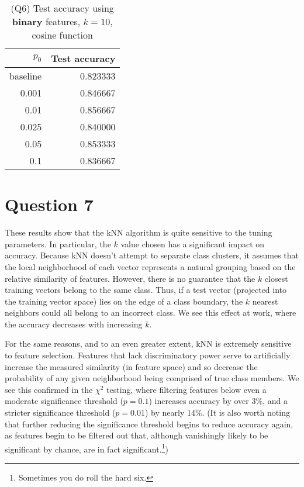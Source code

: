 \documentclass[oneside,justified,marginals=raggedouter]{tufte-handout}
\begin{document}
\begin{table}
\begin{tabular}{@{}rr@{}}
\toprule
$p_0$ & Test accuracy \\ \midrule
baseline & 0.823333 \\
0.001    & 0.846667 \\
0.01     & 0.856667 \\
0.025    & 0.840000 \\
0.05     & 0.853333 \\
0.1      & 0.836667 \\
\bottomrule
\end{tabular}
\caption{(Q6) Test accuracy using {\bf binary} features, {\bf $k=10$},
cosine function}
\end{table}

\section{Question 7}

These results show that the kNN algorithm is quite sensitive to the
tuning parameters. In particular, the $k$ value chosen has a significant
impact on accuracy. Because kNN doesn't attempt to separate class clusters,
it assumes that the local neighborhood of each vector
represents a natural grouping based on the relative
similarity of features. However, there is no guarantee that the $k$ closest
training vectors belong to the same class. Thus, if a test vector (projected
into the training vector space) lies on the edge of a class boundary, the
$k$ nearest neighbors could all belong to an incorrect class. We see this
effect at work, where the accuracy decreases with increasing $k$.

For the same reasons, and to an even greater extent, kNN is extremely
sensitive to feature selection. Features that lack discriminatory power
serve to artificially increase the measured similarity (in feature space) and
so decrease the probability of any given neighborhood being comprised of
true class members. We see this confirmed in the $\chi^2$ testing, where
filtering features below even a moderate significance threshold ($p=0.1$)
increases accuracy by over 3\%, and a stricter significance threshold ($p=0.01$)
by nearly 14\%. (It is also worth noting that further reducing the significance
threshold begins to reduce accuracy again, as features begin to be filtered
out that, although vanishingly likely to be significant by chance, are in fact
significant.\footnote{Sometimes you do roll the hard six.})
\end{document}
